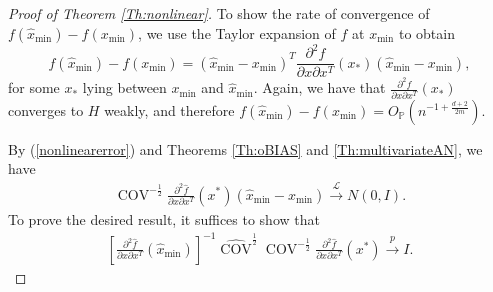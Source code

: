 \documentclass[12pt]{article}
\theoremstyle{plain}
\theoremstyle{remark}
\begin{document}
\begin{proof}[Proof of Theorem \ref{Th:nonlinear}]
    To show the rate of convergence of $f(\hat{x}_{\min})-f(x_{\min})$, we use the Taylor expansion of $f$ at $x_{\min}$ to obtain
    \[f(\hat{x}_{\min})-f(x_{\min})=(\hat{x}_{\min}-x_{\min})^T\frac{\partial^2{f}}{\partial x\partial x^T}(x_*)(\hat{x}_{\min}-x_{\min}),\]
    for some $x_*$ lying between $x_{\min}$ and $\hat{x}_{\min}$. Again, we have that $\frac{\partial^2{f}}{\partial x\partial x^T}(x_*)$ converges to $H$ weakly, and therefore $f(\hat{x}_{\min})-f(x_{\min})=O_\mathbb{P}(n^{-1+\frac{d+2}{2m}})$.

    By (\ref{nonlinearerror}) and Theorems \ref{Th:oBIAS} and \ref{Th:multivariateAN}, we have
    \begin{eqnarray}
        \operatorname{COV}^{-\frac{1}{2}}\frac{\partial^2\hat{f}}{\partial x\partial x^T}(x^*)\left(\hat{x}_{\min}-x_{\min}\right)\xrightarrow{\mathscr{L}}N(0,I).
    \end{eqnarray}
    To prove the desired result, it suffices to show that
    \begin{eqnarray}\label{nonlineare1}
        \left[\frac{\partial^2\hat{f}}{\partial x\partial x^T}(\hat{x}_{\min})\right]^{-1}\widehat{\operatorname{COV}}^{\frac{1}{2}}\operatorname{COV}^{-\frac{1}{2}}\frac{\partial^2\hat{f}}{\partial x\partial x^T}(x^*)\xrightarrow{p} I.
    \end{eqnarray}



\end{proof}
\end{document}
